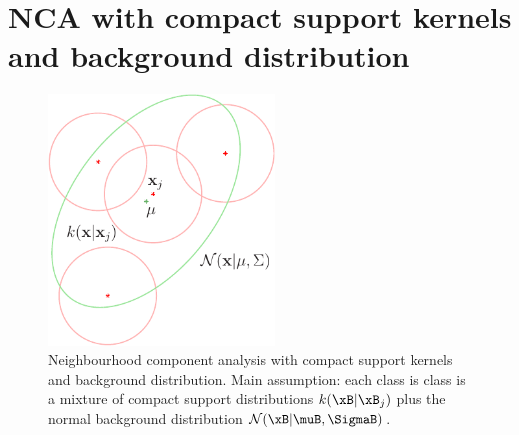 \section{NCA with compact support kernels and background distribution}
\label{sec:nca-cs-back}


\begin{figure}
  \centering\includegraphics[width=6cm]{images/nca-cs-back}
  \caption{Neighbourhood component analysis with compact support kernels and
background distribution. Main assumption: each class is class is a mixture of
compact support distributions $k(\xB|\xB_j)$ plus the normal background
distribution $\mathcal{N}(\xB|\muB,\SigmaB)$.}
  \label{fig:cs-back}
\end{figure}

